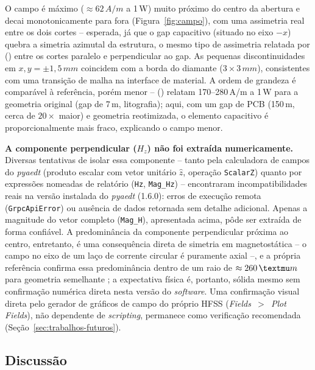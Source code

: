 \documentclass[10pt,a4paper,twocolumn]{article}
\newcommand{\citeonline}[1]{\citeauthor{#1} (\citeyear{#1})}
\begin{document}
O campo \'e m\'aximo ($\approx62\,A/m$ a 1\,W) muito
pr\'oximo do centro da abertura e decai monotonicamente para fora
(Figura~\ref{fig:campo}), com uma assimetria real entre os dois
cortes -- esperada, j\'a que o gap capacitivo (situado no eixo $-x$)
quebra a simetria azimutal da estrutura, o mesmo tipo de assimetria
relatada por \citeonline{opaluch2021} entre os cortes paralelo e
perpendicular ao gap. As pequenas discontinuidades em
$x,y=\pm1,5\,mm$ coincidem com a borda do diamante
($3\times3\,mm$), consistentes com uma transi\c{c}\~ao de
malha na interface de material. A ordem de grandeza \'e compar\'avel \`a
refer\^encia, por\'em menor -- \citeonline{opaluch2021} relatam
170--280\,A/m a 1\,W para a geometria original (gap de
7\,\textmu m, litografia); aqui, com um gap de PCB
(150\,\textmu m, cerca de $20\times$ maior) e geometria
reotimizada, o elemento capacitivo \'e proporcionalmente mais fraco,
explicando o campo menor.

\textbf{A componente perpendicular ($H_z$) n\~ao foi extra\'ida
numericamente.} Diversas tentativas de isolar essa componente --
tanto pela calculadora de campos do \emph{pyaedt} (produto escalar com
vetor unit\'ario $\hat{z}$, opera\c{c}\~ao \texttt{ScalarZ}) quanto por
express\~oes nomeadas de relat\'orio (\texttt{Hz}, \texttt{Mag\_Hz})
-- encontraram incompatibilidades reais na vers\~ao instalada do
\emph{pyaedt} (1.6.0): erros de execu\c{c}\~ao remota
(\texttt{GrpcApiError}) ou aus\^encia de dados retornada sem detalhe
adicional. Apenas a magnitude do vetor completo (\texttt{Mag\_H}),
apresentada acima, p\^ode ser extra\'ida de forma confi\'avel. A
predomin\^ancia da componente perpendicular pr\'oxima ao centro,
entretanto, \'e uma consequ\^encia direta de simetria em
magnetost\'atica -- o campo no eixo de um la\c{c}o de corrente circular
\'e puramente axial --, e a pr\'opria refer\^encia confirma essa
predomin\^ancia dentro de um raio de $\approx260\,\textmu m$ para
geometria semelhante \cite{opaluch2021}; a expectativa f\'isica \'e,
portanto, s\'olida mesmo sem confirma\c{c}\~ao num\'erica direta nesta
vers\~ao do \emph{software}. Uma confirma\c{c}\~ao visual direta pelo
gerador de gr\'aficos de campo do pr\'oprio HFSS (\emph{Fields~$>$~Plot
Fields}), n\~ao dependente de \emph{scripting}, permanece como
verifica\c{c}\~ao recomendada (Se\c{c}\~ao~\ref{sec:trabalhos-futuros}).

\subsection{Discuss\~ao}
\end{document}

